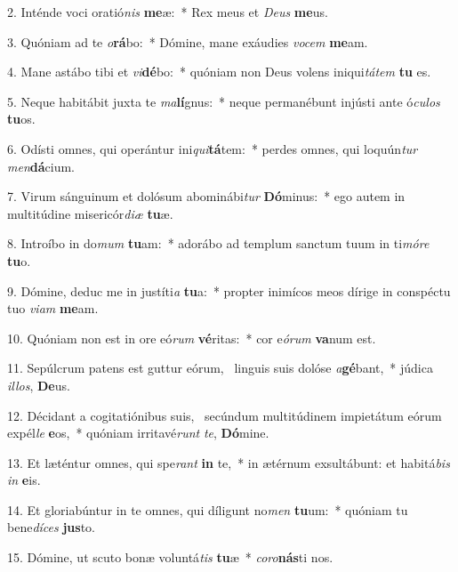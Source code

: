 2. Inténde voci oratió\textit{nis} \textbf{me}æ:~*  Rex meus et \textit{De}\textit{us} \textbf{me}us.\

3. Quóniam ad te \textit{o}\textbf{rá}bo:~*  Dómine, mane exáudies \textit{vo}\textit{cem} \textbf{me}am.\

4. Mane astábo tibi et \textit{vi}\textbf{dé}bo:~*  quóniam non Deus volens iniqui\textit{tá}\textit{tem} \textbf{tu} es.\

5. Neque habitábit juxta te \textit{ma}\textbf{lí}gnus:~*  neque permanébunt injústi ante ó\textit{cu}\textit{los} \textbf{tu}os.\

6. Odísti omnes, qui operántur ini\textit{qui}\textbf{tá}tem:~*  perdes omnes, qui loquún\textit{tur} \textit{men}\textbf{dá}cium.\

7. Virum sánguinum et dolósum abominábi\textit{tur} \textbf{Dó}minus:~*  ego autem in multitúdine misericór\textit{di}\textit{æ} \textbf{tu}æ.\

8. Introíbo in do\textit{mum} \textbf{tu}am:~*  adorábo ad templum sanctum tuum in ti\textit{mó}\textit{re} \textbf{tu}o.\

9. Dómine, deduc me in justíti\textit{a} \textbf{tu}a:~*  propter inimícos meos dírige in conspéctu tuo \textit{vi}\textit{am} \textbf{me}am.\

10. Quóniam non est in ore eó\textit{rum} \textbf{vé}ritas:~*  cor e\textit{ó}\textit{rum} \textbf{va}num est.\

11. Sepúlcrum patens est guttur eórum, \dag\  linguis suis dolóse \textit{a}\textbf{gé}bant,~*  júdica \textit{il}\textit{los}, \textbf{De}us.\

12. Décidant a cogitatiónibus suis, \dag\  secúndum multitúdinem impietátum eórum expél\textit{le} \textbf{e}os,~*  quóniam irritavé\textit{runt} \textit{te}, \textbf{Dó}mine.\

13. Et læténtur omnes, qui spe\textit{rant} \textbf{in} te,~*  in ætérnum exsultábunt: et habitá\textit{bis} \textit{in} \textbf{e}is.\

14. Et gloriabúntur in te omnes, qui díligunt no\textit{men} \textbf{tu}um:~*  quóniam tu bene\textit{dí}\textit{ces} \textbf{jus}to.\

15. Dómine, ut scuto bonæ voluntá\textit{tis} \textbf{tu}æ~*  \textit{co}\textit{ro}\textbf{nás}ti nos.\

